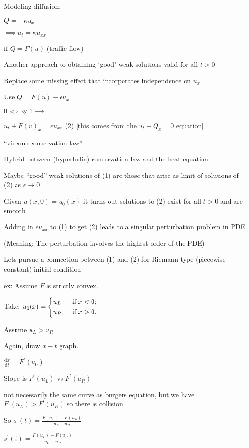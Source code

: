 \documentclass{article}
\theoremstyle{definition}
\begin{document}
Modeling diffusion:

\(Q = - \kappa u_x\)

\(\implies u_t = \kappa u_{x x}\) 

if \(Q = F(u)\) (traffic flow)

Another approach to obtaining `good' weak solutions valid for all \(t > 0\) 

Replace some missing effect that incorporates independence on \(u_x\) 

Use \(Q = F(u) - \epsilon u_x\)

\(0 < \epsilon \ll 1 \implies \)

\(u_t + F(u)_x = \epsilon u_{x x}\)  (2) [this comes from the \(u_t + Q_x = 0\) equation]

``viscous conservation law''

Hybrid between (hyperbolic) conservation law and the heat equation

Maybe ``good'' weak solutions of (1) are those that arise as limit of solutions of (2) as \(\epsilon \to 0\)

Given \(u(x,0)=u_0(x)\) it turns out solutions to (2) exist for all \(t > 0\) and are \underline{smooth} 

Adding in \(\epsilon u_{x x}\) to (1) to get (2) leads to a \underline{singular perturbation} problem in PDE

(Meaning: The perturbation involves the highest order of the PDE)

Lets pursue a connection between (1) and (2) for Riemann-type (piecewise constant) initial condition

ex: Assume \(F\) is strictly convex.

Take: \(u_0(x) = \begin{dcases}
    u_L, &\text{ if } x < 0 ;\\
    u_R, &\text{ if } x > 0 .
\end{dcases}\) 

Assume \(u_L > u_R\) 

Again, draw \(x-t\) graph.

\(\frac{\mathrm{d}x}{\mathrm{d}t} = F^{\prime} (u_0)\) 

Slope is \(F^{\prime} (u_L)\) vs \(F^{\prime} (u_R)\)

not necessarily the same curve as burgers equation, but we have \(F^{\prime} (u_L) > F^{\prime} (u_R)\) so there is collision

So \(s^{\prime} (t) = \frac{F(u_L)-F(u_R)}{u_L - u_R}\) 

\(s^{\prime} (t) = \frac{F(u_L)-F(u_R)}{u_L - u_R}\)
\end{document}
